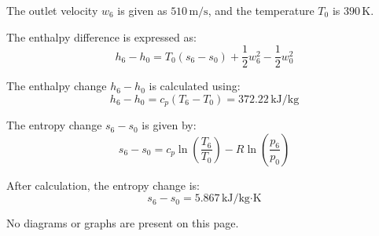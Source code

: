 The outlet velocity \( w_6 \) is given as \( 510 \, \text{m/s} \), and the temperature \( T_0 \) is \( 390 \, \text{K} \).  

The enthalpy difference is expressed as:  
\[
h_6 - h_0 = T_0 (s_6 - s_0) + \frac{1}{2} w_6^2 - \frac{1}{2} w_0^2
\]  

The enthalpy change \( h_6 - h_0 \) is calculated using:  
\[
h_6 - h_0 = c_p (T_6 - T_0) = 372.22 \, \text{kJ/kg}
\]  

The entropy change \( s_6 - s_0 \) is given by:  
\[
s_6 - s_0 = c_p \ln \left( \frac{T_6}{T_0} \right) - R \ln \left( \frac{p_6}{p_0} \right)
\]  

After calculation, the entropy change is:  
\[
s_6 - s_0 = 5.867 \, \text{kJ/kg·K}
\]  

No diagrams or graphs are present on this page.